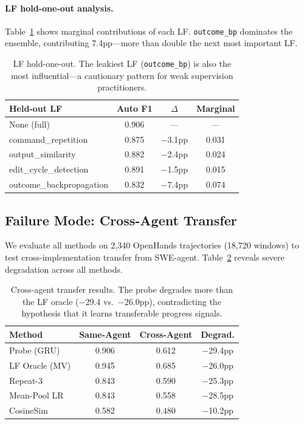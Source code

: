 \documentclass[11pt,a4paper]{article}
\begin{document}
\paragraph{LF hold-one-out analysis.}
Table~\ref{tab:lf-holdout} shows marginal contributions of each LF.
\texttt{outcome\_bp} dominates the ensemble, contributing 7.4pp---more than double the next most important LF.

\begin{table}[t]
\centering
\small
\begin{tabular}{lccc}
\toprule
\textbf{Held-out LF} & \textbf{Auto F1} & \textbf{$\Delta$} & \textbf{Marginal} \\
\midrule
None (full) & 0.906 & --- & --- \\
command\_repetition & 0.875 & $-$3.1pp & 0.031 \\
output\_similarity & 0.882 & $-$2.4pp & 0.024 \\
edit\_cycle\_detection & 0.891 & $-$1.5pp & 0.015 \\
outcome\_backpropagation & 0.832 & $-$7.4pp & 0.074 \\
\bottomrule
\end{tabular}
\caption{LF hold-one-out. The leakiest LF (\texttt{outcome\_bp}) is also the most influential---a cautionary pattern for weak supervision practitioners.}
\label{tab:lf-holdout}
\end{table}

\subsection{Failure Mode: Cross-Agent Transfer}
\label{sec:cross-agent}

We evaluate all methods on 2,340 OpenHands trajectories (18,720 windows) to test cross-implementation transfer from SWE-agent.
Table~\ref{tab:cross-agent} reveals severe degradation across all methods.

\begin{table}[t]
\centering
\small
\begin{tabular}{lccc}
\toprule
\textbf{Method} & \textbf{Same-Agent} & \textbf{Cross-Agent} & \textbf{Degrad.} \\
\midrule
Probe (GRU) & 0.906 & 0.612 & $-$29.4pp \\
LF Oracle (MV) & 0.945 & 0.685 & $-$26.0pp \\
Repeat-3 & 0.843 & 0.590 & $-$25.3pp \\
Mean-Pool LR & 0.843 & 0.558 & $-$28.5pp \\
CosineSim & 0.582 & 0.480 & $-$10.2pp \\
\bottomrule
\end{tabular}
\caption{Cross-agent transfer results. The probe degrades more than the LF oracle ($-$29.4 vs.\ $-$26.0pp), contradicting the hypothesis that it learns transferable progress signals.}
\label{tab:cross-agent}
\end{table}
\end{document}
